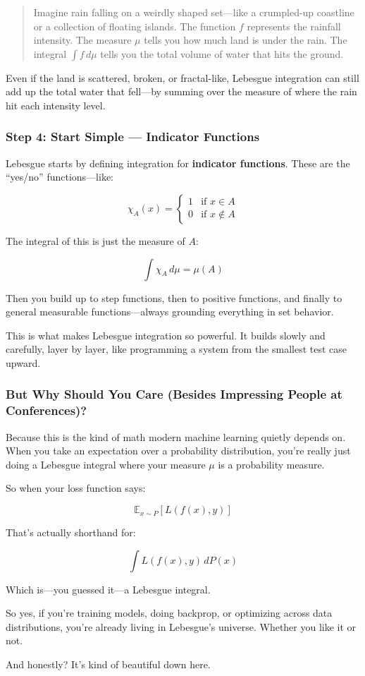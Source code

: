 \begin{quote}
Imagine rain falling on a weirdly shaped set—like a crumpled-up coastline or a collection of floating islands. The function \( f \) represents the rainfall intensity. The measure \( \mu \) tells you how much land is under the rain. The integral \( \int f\,d\mu \) tells you the total volume of water that hits the ground.
\end{quote}

Even if the land is scattered, broken, or fractal-like, Lebesgue integration can still add up the total water that fell—by summing over the measure of where the rain hit each intensity level.

\subsubsection{Step 4: Start Simple — Indicator Functions}

Lebesgue starts by defining integration for \textbf{indicator functions}. These are the “yes/no” functions—like:

\[
\chi_A(x) =
\begin{cases}
1 & \text{if } x \in A \\
0 & \text{if } x \notin A
\end{cases}
\]

The integral of this is just the measure of \( A \):

\[
\int \chi_A \, d\mu = \mu(A)
\]

Then you build up to step functions, then to positive functions, and finally to general measurable functions—always grounding everything in set behavior.

This is what makes Lebesgue integration so powerful. It builds slowly and carefully, layer by layer, like programming a system from the smallest test case upward.

\subsubsection{But Why Should You Care (Besides Impressing People at Conferences)?}

Because this is the kind of math modern machine learning quietly depends on. When you take an expectation over a probability distribution, you’re really just doing a Lebesgue integral where your measure \( \mu \) is a probability measure.

So when your loss function says:

\[
\mathbb{E}_{x \sim P}[L(f(x), y)]
\]

That’s actually shorthand for:

\[
\int L(f(x), y) \, dP(x)
\]

Which is—you guessed it—a Lebesgue integral.

So yes, if you're training models, doing backprop, or optimizing across data distributions, you're already living in Lebesgue's universe. Whether you like it or not.

And honestly? It’s kind of beautiful down here.